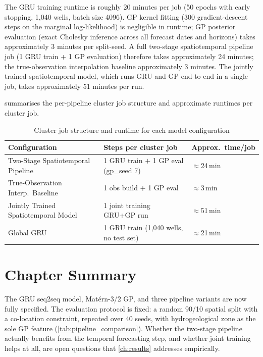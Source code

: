 The GRU training runtime is roughly 20 minutes per job (50 epochs with early stopping,
1{,}040 wells, batch size 4096). GP kernel fitting (300 gradient-descent steps on the
marginal log-likelihood) is negligible in runtime; GP posterior evaluation (exact Cholesky
inference across all forecast dates and horizons) takes approximately 3 minutes per
split-seed. A full two-stage spatiotemporal pipeline job (1 GRU train + 1 GP evaluation)
therefore takes approximately 24 minutes; the true-observation interpolation baseline approximately 3 minutes. The jointly trained spatiotemporal model, which runs GRU and GP end-to-end in a single job, takes approximately 51 minutes
per run.

 summarises the per-pipeline cluster job structure and
approximate runtimes per cluster job.

\begin{table}[htbp]
\centering
\begin{tabular}{lll}
\toprule
\textbf{Configuration} & \textbf{Steps per cluster job} & \textbf{Approx.\ time/job} \\
\midrule
Two-Stage Spatiotemporal Pipeline  & 1 GRU train $+$ 1 GP eval (gp\_seed 7) & $\approx$24\,min \\
True-Observation Interp.\ Baseline & 1 obs build $+$ 1 GP eval               & $\approx$3\,min \\
Jointly Trained Spatiotemporal Model & 1 joint training GRU+GP run              & $\approx$51\,min \\
Global GRU & 1 GRU train (1{,}040 wells, no test set) & $\approx$21\,min \\
\bottomrule
\end{tabular}
\caption{Cluster job structure and runtime for each model configuration}
\label{tab:pipeline_efficiency}
\end{table}

\section{Chapter Summary}

The GRU seq2seq model, Matérn-3/2 GP, and three pipeline variants are now fully specified. The evaluation protocol is fixed: a random 90/10 spatial split with a co-location constraint, repeated over 40 seeds, with hydrogeological zone as the sole GP feature (\cref{tab:pipeline_comparison}). Whether the two-stage pipeline actually benefits from the temporal forecasting step, and whether joint training helps at all, are open questions that \cref{ch:results} addresses empirically.
